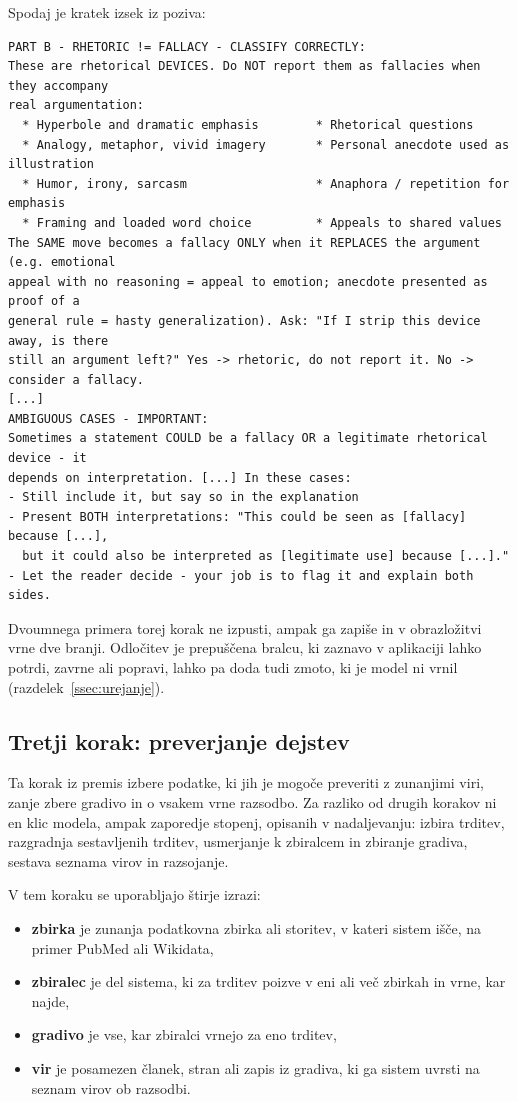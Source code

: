 \documentclass[a4paper, 12pt]{book}
\begin{document}
Spodaj je kratek izsek iz poziva:

\begin{lstlisting}[basicstyle=\ttfamily\scriptsize,breaklines=true]
PART B - RHETORIC != FALLACY - CLASSIFY CORRECTLY:
These are rhetorical DEVICES. Do NOT report them as fallacies when they accompany
real argumentation:
  * Hyperbole and dramatic emphasis        * Rhetorical questions
  * Analogy, metaphor, vivid imagery       * Personal anecdote used as illustration
  * Humor, irony, sarcasm                  * Anaphora / repetition for emphasis
  * Framing and loaded word choice         * Appeals to shared values
The SAME move becomes a fallacy ONLY when it REPLACES the argument (e.g. emotional
appeal with no reasoning = appeal to emotion; anecdote presented as proof of a
general rule = hasty generalization). Ask: "If I strip this device away, is there
still an argument left?" Yes -> rhetoric, do not report it. No -> consider a fallacy.
[...]
AMBIGUOUS CASES - IMPORTANT:
Sometimes a statement COULD be a fallacy OR a legitimate rhetorical device - it
depends on interpretation. [...] In these cases:
- Still include it, but say so in the explanation
- Present BOTH interpretations: "This could be seen as [fallacy] because [...],
  but it could also be interpreted as [legitimate use] because [...]."
- Let the reader decide - your job is to flag it and explain both sides.
\end{lstlisting}

Dvoumnega primera torej korak ne izpusti, ampak ga zapiše in v obrazložitvi vrne dve branji. Odločitev je prepuščena bralcu, ki zaznavo v aplikaciji lahko potrdi, zavrne ali popravi, lahko pa doda tudi zmoto, ki je model ni vrnil (razdelek~\ref{ssec:urejanje}).

\subsection{Tretji korak: preverjanje dejstev}
\label{sec:fact-checking}

Ta korak iz premis izbere podatke, ki jih je mogoče preveriti z zunanjimi viri, zanje zbere gradivo in o vsakem vrne razsodbo. Za razliko od drugih korakov ni en klic modela, ampak zaporedje stopenj, opisanih v nadaljevanju: izbira trditev, razgradnja sestavljenih trditev, usmerjanje k zbiralcem in zbiranje gradiva, sestava seznama virov in razsojanje.

V tem koraku se uporabljajo štirje izrazi:
\begin{itemize}
\item \textbf{zbirka} je zunanja podatkovna zbirka ali storitev, v kateri sistem išče, na primer PubMed ali Wikidata,
\item \textbf{zbiralec} je del sistema, ki za trditev poizve v eni ali več zbirkah in vrne, kar najde,
\item \textbf{gradivo} je vse, kar zbiralci vrnejo za eno trditev,
\item \textbf{vir} je posamezen članek, stran ali zapis iz gradiva, ki ga sistem uvrsti na seznam virov ob razsodbi.
\end{itemize}
\end{document}
